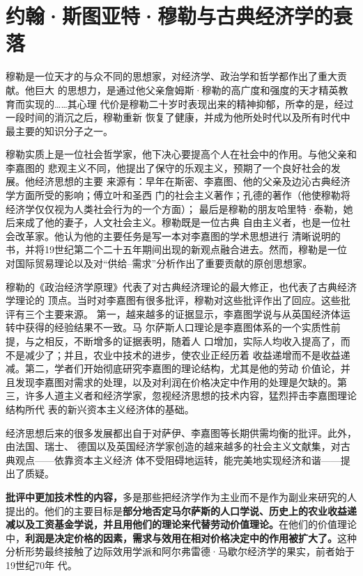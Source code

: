 \chapter{约翰·斯图亚特·穆勒与古典经济学的衰落}
\label{cha:mill}


穆勒是一位天才的与众不同的思想家，对经济学、政治学和哲学都作出了重大贡献。他巨大
的思想力，是通过他父亲詹姆斯·穆勒的高广度和强度的天才精英教育而实现的……其心理
代价是穆勒二十岁时表现出来的精神抑郁，所幸的是，经过一段时间的消沉之后，穆勒重新
恢复了健康，并成为他所处时代以及所有时代中最主要的知识分子之一。

穆勒实质上是一位社会哲学家，他下决心要提高个人在社会中的作用。与他父亲和李嘉图的
悲观主义不同，他提出了保守的乐观主义，预期了一个良好社会的发展。他经济思想的主要
来源有：早年在斯密、李嘉图、他的父亲及边沁古典经济学方面所受的影响；傅立叶和圣西
门的社会主义著作；孔德的著作（他使穆勒将经济学仅仅视为人类社会行为的一个方面）；
最后是穆勒的朋友哈里特·泰勒，她后来成了他的妻子，人文社会主义。穆勒既是一位古典
自由主义者，也是一位社会改革家。他认为他的主要任务是写一本对李嘉图的学术思想进行
清晰说明的书，并将19世纪第二个二十五年期间出现的新观点融合进去。然而，穆勒是一位
对国际贸易理论以及对“供给--需求”分析作出了重要贡献的原创思想家。

穆勒的《政治经济学原理》代表了对古典经济理论的最大修正，也代表了古典经济学理论的
顶点。当时对李嘉图有很多批评，穆勒对这些批评作出了回应。这些批评有三个主要来源。
第一，越来越多的证据显示，李嘉图学说与从英国经济体运转中获得的经验结果不一致。马
尔萨斯人口理论是李嘉图体系的一个实质性前提，与之相反，不断增多的证据表明，随着人
口增加，实际人均收入提高了，而不是减少了；并且，农业中技术的进步，使农业正经历着
收益递增而不是收益递减。第二，学者们开始彻底研究李嘉图的理论结构，尤其是他的劳动
价值论，并且发现李嘉图对需求的处理，以及对利润在价格决定中作用的处理是欠缺的。第
三，许多人道主义者和经济学家，忽视经济思想的技术内容，猛烈抨击李嘉图理论结构所代
表的新兴资本主义经济体的基础。

经济思想后来的很多发展都出自于对萨伊、李嘉图等长期供需均衡的批评。此外，由法国、瑞士、
德国以及英国经济学家创造的越来越多的社会主义文献集，对古典观点——依靠资本主义经济
体不受阻碍地运转，能完美地实现经济和谐——提出了质疑。

\textbf{批评中更加技术性的内容，}多是那些把经济学作为主业而不是作为副业来研究的人
提出的。他们的主要目标是\textbf{部分地否定马尔萨斯的人口学说、历史上的农业收益递
  减以及工资基金学说，并且用他们的理论来代替劳动价值理论。}在他们的价值理论
中，\textbf{利润是决定价格的因素，需求与效用在相对价格决定中的作用被扩大了。}这种
分析形势最终接触了边际效用学派和阿尔弗雷德·马歇尔经济学的果实，前者始于19世纪70年
代。

